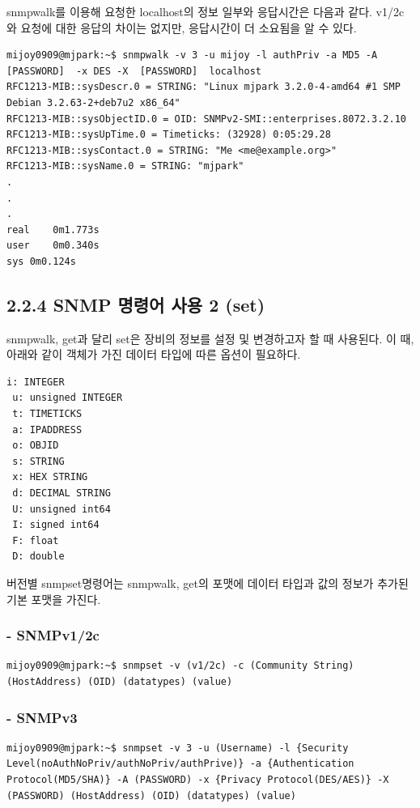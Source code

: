 \documentclass[11pt
  , a4paper
  , article
  , oneside
]{memoir}
\begin{document}
snmpwalk를 이용해 요청한 localhost의 정보 일부와 응답시간은 다음과 같다. v1/2c와 요청에 대한 응답의 차이는 없지만, 응답시간이 더 소요됨을 알 수 있다.

\begin{lstlisting}[style=termstyle]
mijoy0909@mjpark:~$ snmpwalk -v 3 -u mijoy -l authPriv -a MD5 -A  [PASSWORD]  -x DES -X  [PASSWORD]  localhost
RFC1213-MIB::sysDescr.0 = STRING: "Linux mjpark 3.2.0-4-amd64 #1 SMP Debian 3.2.63-2+deb7u2 x86_64"
RFC1213-MIB::sysObjectID.0 = OID: SNMPv2-SMI::enterprises.8072.3.2.10
RFC1213-MIB::sysUpTime.0 = Timeticks: (32928) 0:05:29.28
RFC1213-MIB::sysContact.0 = STRING: "Me <me@example.org>"
RFC1213-MIB::sysName.0 = STRING: "mjpark"
.
.
.
real	0m1.773s
user	0m0.340s
sys	0m0.124s
\end{lstlisting}


\subsection{2.2.4 SNMP 명령어 사용 2 (set)}

snmpwalk, get과 달리 set은 장비의 정보를 설정 및 변경하고자 할 때 사용된다. 이 때, 아래와 같이 객체가 가진 데이터 타입에 따른 옵션이 필요하다.

\begin{lstlisting}[style=termstyle]
 i: INTEGER 
 u: unsigned INTEGER 
 t: TIMETICKS
 a: IPADDRESS
 o: OBJID
 s: STRING
 x: HEX STRING
 d: DECIMAL STRING
 U: unsigned int64
 I: signed int64
 F: float
 D: double
\end{lstlisting}

버전별 snmpset명령어는 snmpwalk, get의 포맷에 데이터 타입과 값의 정보가 추가된 기본 포맷을 가진다.

\subsubsection{- SNMPv1/2c}

\begin{lstlisting}[style=termstyle]
mijoy0909@mjpark:~$ snmpset -v (v1/2c) -c (Community String) (HostAddress) (OID) (datatypes) (value)
\end{lstlisting}

\subsubsection{- SNMPv3}

\begin{lstlisting}[style=termstyle]
mijoy0909@mjpark:~$ snmpset -v 3 -u (Username) -l {Security Level(noAuthNoPriv/authNoPriv/authPrive)} -a {Authentication Protocol(MD5/SHA)} -A (PASSWORD) -x {Privacy Protocol(DES/AES)} -X (PASSWORD) (HostAddress) (OID) (datatypes) (value)
\end{lstlisting}
\end{document}
